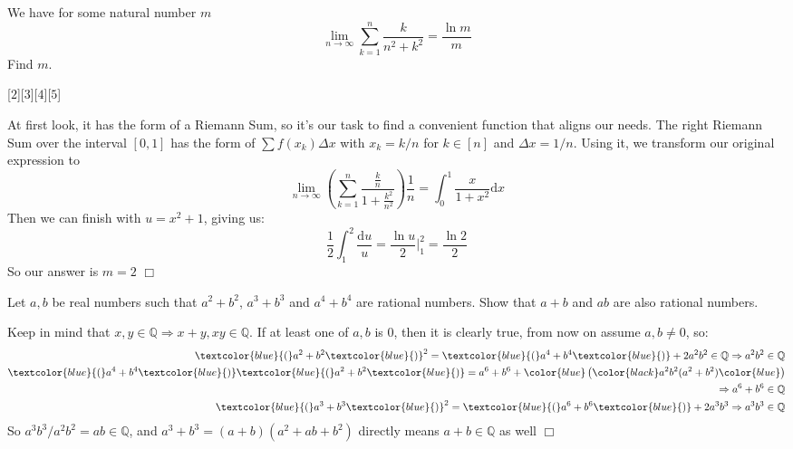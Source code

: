 \begin{problem}
    We have for some natural number \( m \)
    \[
    \lim_{n \to \infty} \sum_{k=1}^{n} \frac{k}{n^2 + k^2} = \frac{\ln m}{m}
    \]
    Find \( m \).
\end{problem}
[$2$][$3$][$4$][$5$]

\begin{solution}[B]
    At first look, it has the form of a Riemann Sum, so it's our task to find a convenient function that aligns our needs. The right Riemann Sum over the interval $[0,1]$ has the form of $\sum f(x_k) \Delta x$ with $x_k = k/n$ for $k \in [n]$ and $\Delta x = 1/n$. Using it, we transform our original expression to
    $$ \lim _{n \rightarrow \infty} \left(\sum_{k=1}^n \frac{\frac{k}{n}}{1 + \frac{k^2}{n^2}} \right) \frac{1}{n} = \int_0^1 \frac{x}{1 + x^2} \mathrm{d}x$$
    Then we can finish with $u = x^2+1$, giving us:
    $$ \frac{1}{2}\int_1^2 \frac{\mathrm{d}u}{u} = \frac{\ln u}{2} \bigg|_1^2 = \frac{\ln 2}{2}$$
    So our answer is $m=2$ $\Box$
\end{solution}

\begin{problem}[A][8]
    Let $a,b$ be real numbers such that  $a^2+b^2$, $a^3+b^3$ and $a^4+b^4$ are rational numbers. Show that $a+b$ and $ab$ are also rational numbers.
\end{problem}

\begin{solution}
    Keep in mind that $x, y \in \mathbb{Q} \Rightarrow x+y, xy \in \mathbb{Q}$. If at least one of $a,b$ is 0, then it is clearly true, from now on assume $a,b \neq 0$, so:
    \begin{align*}
        \textcolor{blue}{(}a^2+b^2\textcolor{blue}{)}^2 = \textcolor{blue}{(} a^4+b^4 \textcolor{blue}{)} + 2a^2b^2 \in \mathbb{Q} \Rightarrow a^2b^2 \in \mathbb{Q} \\
        \textcolor{blue}{(}a^4+b^4\textcolor{blue}{)} \textcolor{blue}{(} a^2+b^2 \textcolor{blue}{)} = a^6+b^6 +  \color{blue} \left ( \color{black} a^2b^2(a^2+b^2) \color{blue}\right ) \\
        \Rightarrow a^6+b^6 \in \mathbb{Q} \\
        \textcolor{blue}{(} a^3+b^3 \textcolor{blue}{)}^2 = \textcolor{blue}{(} a^6 + b^6 \textcolor{blue}{)} + 2a^3b^3 \Rightarrow a^3b^3 \in \mathbb{Q}
    \end{align*}
    So $a^3b^3 / a^2b^2 = ab \in \mathbb{Q}$, and $a^3+b^3 = (a+b)(a^2+ab+b^2)$ directly means $a+b \in \mathbb{Q}$ as well $\Box$
    
\end{solution}

